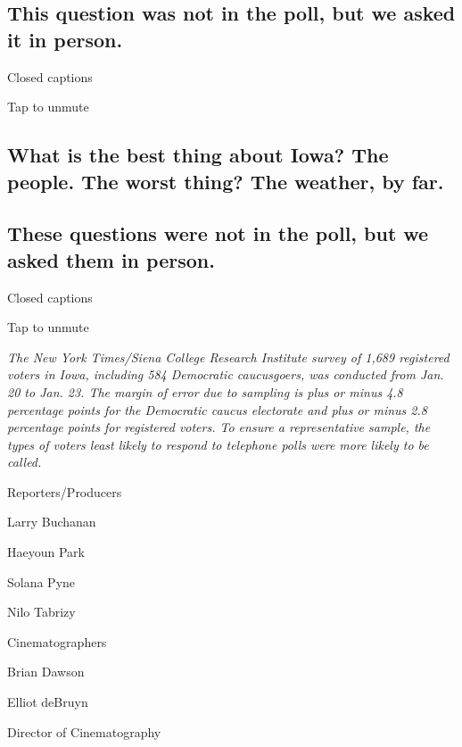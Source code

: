 \hypertarget{this-question-was-not-in-the-poll-but-we-asked-it-in-person}{%
\subsection{This question was not in the poll, but we asked it in
person.}\label{this-question-was-not-in-the-poll-but-we-asked-it-in-person}}

Closed captions

Tap to unmute

\hypertarget{what-is-the-best-thing-about-iowa-the-people-the-worst-thing-the-weather-by-far}{%
\subsection{What is the best thing about Iowa? The people. The worst
thing? The weather, by
far.}\label{what-is-the-best-thing-about-iowa-the-people-the-worst-thing-the-weather-by-far}}

\hypertarget{these-questions-were-not-in-the-poll-but-we-asked-them-in-person}{%
\subsection{These questions were not in the poll, but we asked them in
person.}\label{these-questions-were-not-in-the-poll-but-we-asked-them-in-person}}

Closed captions

Tap to unmute

\emph{The New York Times/Siena College Research Institute survey of
1,689 registered voters in Iowa, including 584 Democratic caucusgoers,
was conducted from Jan. 20 to Jan. 23. The margin of error due to
sampling is plus or minus 4.8 percentage points for the Democratic
caucus electorate and plus or minus 2.8 percentage points for registered
voters. To ensure a representative sample, the types of voters least
likely to respond to telephone polls were more likely to be called.}

Reporters/Producers

Larry Buchanan

Haeyoun Park

Solana Pyne

Nilo Tabrizy

Cinematographers

Brian Dawson

Elliot deBruyn

Director of Cinematography

